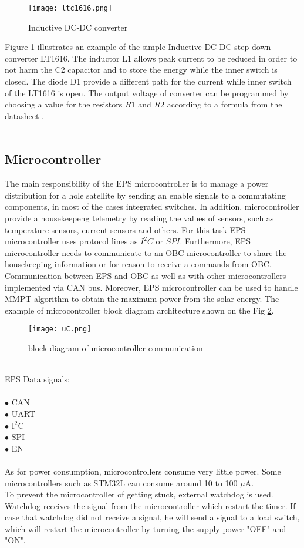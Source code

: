 \begin{figure}[h]
	\centering
	\texttt{[image: ltc1616.png]}
	\caption{ Inductive DC-DC converter \cite{19}}
	\label{fig: EPS41}
\end{figure}

Figure \ref{fig: EPS41} illustrates an example of the simple Inductive DC-DC step-down converter LT1616. The inductor L1 allows peak current to be reduced in order to not harm the C2 capacitor and to store the energy while the inner switch is closed. The diode D1 provide a different path for the current while inner switch of the LT1616 is open. The output voltage of converter can be programmed by choosing a value for the resistors $R1$ and $R2$ according to a formula from the datasheet \cite{19} . 
\\
\\

\subsection{Microcontroller \label{sec:tech}}
The main responsibility of the EPS microcontroller is to manage a power distribution for a hole satellite by sending an enable signals to a commutating components, in most of the cases integrated switches. In addition, microcontroller provide a housekeepeng telemetry by reading the values of sensors, such as temperature sensors, current sensors and others. For this task EPS microcontroller uses protocol lines as $I^{2}C$ or $SPI$. Furthermore, EPS microcontroller needs to communicate to an OBC microcontroller to share the housekeeping information or for reason to receive a commands from OBC. Communication between EPS and OBC as well as with other microcontrollers implemented via CAN bus. Moreover, EPS microcontroller can be used to handle MMPT algorithm to obtain the maximum power from the solar energy. The example of microcontroller block diagram architecture shown on the Fig \ref{fig: EPS4121}.	
\\
\begin{figure}[h]
	\centering
	\texttt{[image: uC.png]}
	\caption{block diagram of microcontroller communication}
	\label{fig: EPS4121}
\end{figure}
\\
EPS Data signals:\\ \\
$\bullet$ CAN\\
$\bullet$ UART\\
$\bullet$ I$^{2}$C\\
$\bullet$  SPI\\
$\bullet$  EN\\
\\
As for power consumption, microcontrollers consume very little power. Some microcontrollers such as STM32L  can consume  around 10 to 100 $\mu$A.\\
To prevent the microcontroller of getting stuck, external watchdog is used. Watchdog receives the signal from the microcontroller which restart the timer. If case that watchdog did not receive a signal, he will send a signal to a load switch, which will restart the microcontroller by turning the supply power "OFF" and "ON".

